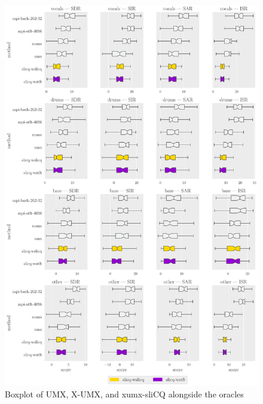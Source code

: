 \documentclass[report.tex]{subfiles}
\begin{document}
\begin{figure}[ht]
	\centering
	\includegraphics[width=\textwidth]{./images-bss/boxplot_full.pdf}
	\caption{Boxplot of UMX, X-UMX, and xumx-sliCQ alongside the oracles}
	\label{fig:bssboxplot}
\end{figure}
\end{document}
